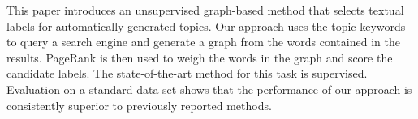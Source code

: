 This paper introduces an unsupervised graph-based method that selects textual labels for automatically generated topics. Our approach uses the topic keywords to query a search engine and generate a graph from the words contained in the results. PageRank is then used to weigh the words in the graph and score the candidate labels. The state-of-the-art method for this task is supervised. Evaluation on a standard data set shows that the performance of our approach is consistently superior to previously reported methods.
